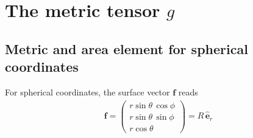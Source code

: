 \documentclass[11pt, DINA4, fleqn]{amsart}
\begin{document}
\section{The metric tensor $g$}


\subsection{Metric and area element for spherical coordinates}
For spherical coordinates, the surface vector $\boldsymbol{f}$ reads
\begin{align}
	\boldsymbol{f} = \begin{pmatrix}
		r \sin\theta \, \cos\phi \\
		r \sin\theta \, \sin\phi \\
		r \cos\theta
	\end{pmatrix} = R\, \hat{\boldsymbol{e}}_r
\end{align}
\end{document}
